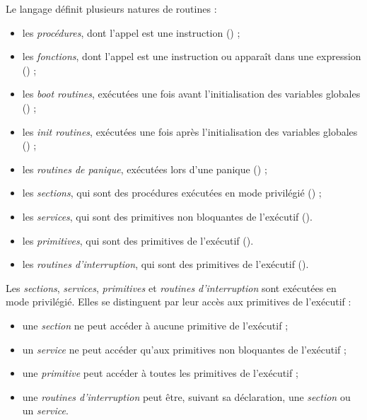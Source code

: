 Le langage définit plusieurs natures de routines :
\begin{itemize}
  \item les \emph{procédures}, dont l'appel est une instruction () ;
  \item les \emph{fonctions}, dont l'appel est une instruction ou apparaît dans une expression () ;
  \item les \emph{boot routines}, exécutées une fois avant l'initialisation des variables globales () ;
  \item les \emph{init routines}, exécutées une fois après l'initialisation des variables globales () ;
  \item les \emph{routines de panique}, exécutées lors d'une panique () ;
  \item les \emph{sections}, qui sont des procédures exécutées en mode privilégié () ;
  \item les \emph{services}, qui sont des primitives non bloquantes de l'exécutif ().
  \item les \emph{primitives}, qui sont des primitives de l'exécutif ().
  \item les \emph{routines d'interruption}, qui sont des primitives de l'exécutif ().
\end{itemize}


Les \emph{sections}, \emph{services}, \emph{primitives} et  \emph{routines d'interruption} sont exécutées en mode privilégié. Elles se distinguent par leur accès aux primitives de l'exécutif :
\begin{itemize}
  \item une \emph{section} ne peut accéder à aucune primitive de l'exécutif ;
  \item un \emph{service} ne peut accéder qu'aux primitives non bloquantes de l'exécutif ;
  \item une \emph{primitive} peut accéder à toutes les primitives de l'exécutif ;
  \item une \emph{routines d'interruption} peut être, suivant sa déclaration, une \emph{section} ou un \emph{service}.
\end{itemize}







